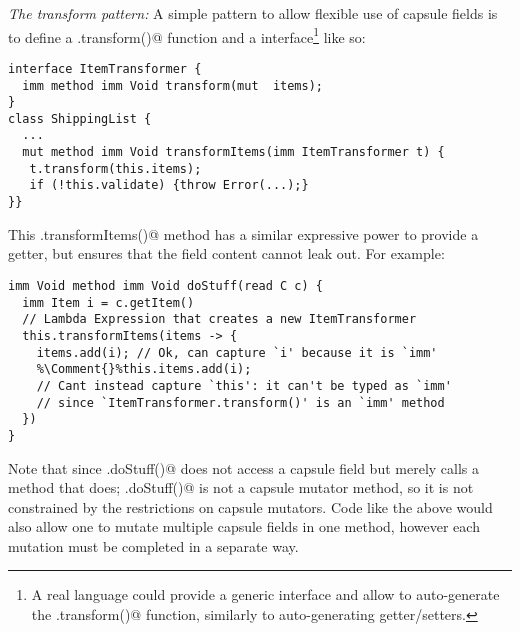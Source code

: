 \loseSpace
\noindent\textit{The transform pattern:}
A simple pattern to allow flexible use of capsule fields is to define a \Q@.transform()@ function and a \Q@ItemTransformer@ interface\footnote{A real language could
provide a generic \Q@Transformer@ interface and allow to auto-generate the \Q@.transform()@ function, similarly to auto-generating getter/setters.} like so:


%
%
%
%
%
%
%

\saveSpace
\begin{lstlisting}
interface ItemTransformer { 
  imm method imm Void transform(mut  items);
}
class ShippingList {
  ...
  mut method imm Void transformItems(imm ItemTransformer t) {
   t.transform(this.items);
   if (!this.validate) {throw Error(...);}
}}
\end{lstlisting}
This \Q@.transformItems()@ method 
has a similar expressive power to provide a
\Q@mut@ getter, but ensures that 
the field content cannot leak out.
For example:
\begin{lstlisting}[escapechar=\%]
imm Void method imm Void doStuff(read C c) {
  imm Item i = c.getItem()
  // Lambda Expression that creates a new ItemTransformer
  this.transformItems(items -> {
    items.add(i); // Ok, can capture `i' because it is `imm'
    %\Comment{}%this.items.add(i);
    // Cant instead capture `this': it can't be typed as `imm'
    // since `ItemTransformer.transform()' is an `imm' method
  })
}
\end{lstlisting}

Note that since \Q@.doStuff()@ does not access a capsule field but merely calls a method that does;
\Q@.doStuff()@ is not a capsule mutator method, so it is not constrained by the restrictions on capsule mutators. Code like the above would also allow one to mutate multiple capsule fields in one method, however each mutation must be completed in a separate way.%


